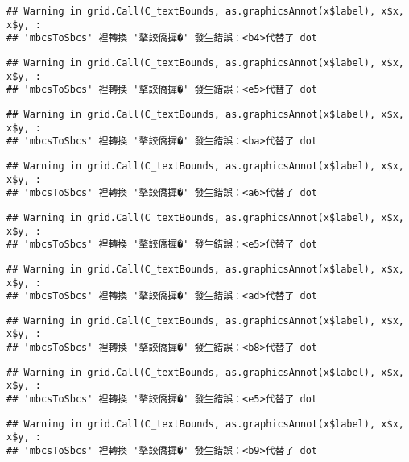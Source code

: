 \documentclass[
]{article}
\begin{document}
\begin{verbatim}
## Warning in grid.Call(C_textBounds, as.graphicsAnnot(x$label), x$x, x$y, :
## 'mbcsToSbcs' 裡轉換 '摮詨僑摨�' 發生錯誤：<b4>代替了 dot
\end{verbatim}

\begin{verbatim}
## Warning in grid.Call(C_textBounds, as.graphicsAnnot(x$label), x$x, x$y, :
## 'mbcsToSbcs' 裡轉換 '摮詨僑摨�' 發生錯誤：<e5>代替了 dot
\end{verbatim}

\begin{verbatim}
## Warning in grid.Call(C_textBounds, as.graphicsAnnot(x$label), x$x, x$y, :
## 'mbcsToSbcs' 裡轉換 '摮詨僑摨�' 發生錯誤：<ba>代替了 dot
\end{verbatim}

\begin{verbatim}
## Warning in grid.Call(C_textBounds, as.graphicsAnnot(x$label), x$x, x$y, :
## 'mbcsToSbcs' 裡轉換 '摮詨僑摨�' 發生錯誤：<a6>代替了 dot
\end{verbatim}

\begin{verbatim}
## Warning in grid.Call(C_textBounds, as.graphicsAnnot(x$label), x$x, x$y, :
## 'mbcsToSbcs' 裡轉換 '摮詨僑摨�' 發生錯誤：<e5>代替了 dot
\end{verbatim}

\begin{verbatim}
## Warning in grid.Call(C_textBounds, as.graphicsAnnot(x$label), x$x, x$y, :
## 'mbcsToSbcs' 裡轉換 '摮詨僑摨�' 發生錯誤：<ad>代替了 dot
\end{verbatim}

\begin{verbatim}
## Warning in grid.Call(C_textBounds, as.graphicsAnnot(x$label), x$x, x$y, :
## 'mbcsToSbcs' 裡轉換 '摮詨僑摨�' 發生錯誤：<b8>代替了 dot
\end{verbatim}

\begin{verbatim}
## Warning in grid.Call(C_textBounds, as.graphicsAnnot(x$label), x$x, x$y, :
## 'mbcsToSbcs' 裡轉換 '摮詨僑摨�' 發生錯誤：<e5>代替了 dot
\end{verbatim}

\begin{verbatim}
## Warning in grid.Call(C_textBounds, as.graphicsAnnot(x$label), x$x, x$y, :
## 'mbcsToSbcs' 裡轉換 '摮詨僑摨�' 發生錯誤：<b9>代替了 dot
\end{verbatim}
\end{document}
